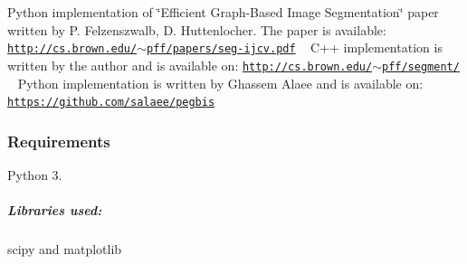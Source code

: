 Python implementation of \char`\"{}\+Efficient Graph-\/\+Based Image Segmentation\char`\"{} paper written by P. Felzenszwalb, D. Huttenlocher. The paper is available\+: \href{http://cs.brown.edu/~pff/papers/seg-ijcv.pdf}{\tt http\+://cs.\+brown.\+edu/$\sim$pff/papers/seg-\/ijcv.\+pdf} ~\newline
 C++ implementation is written by the author and is available on\+: \href{http://cs.brown.edu/~pff/segment/}{\tt http\+://cs.\+brown.\+edu/$\sim$pff/segment/} ~\newline
 Python implementation is written by Ghassem Alaee and is available on\+: \href{https://github.com/salaee/pegbis}{\tt https\+://github.\+com/salaee/pegbis} ~\newline
 ~\newline
 \subsubsection*{Requirements}

Python 3.~\newline


\subparagraph*{Libraries used\+:}

scipy and matplotlib 